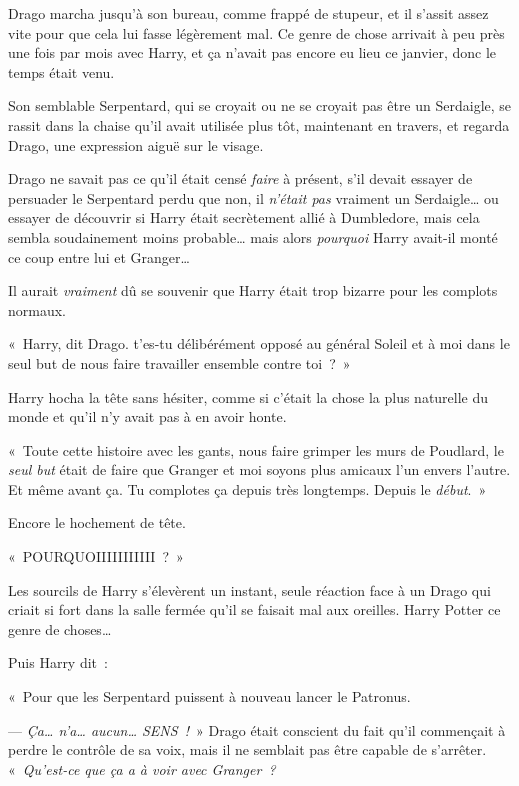 Drago marcha jusqu'à son bureau, comme frappé de stupeur, et il s'assit assez vite pour que cela lui fasse légèrement mal.
Ce genre de chose arrivait à peu près une fois par mois avec Harry, et ça n'avait pas encore eu lieu ce janvier, donc le temps était venu.

Son semblable Serpentard, qui se croyait ou ne se croyait pas être un Serdaigle, se rassit dans la chaise qu'il avait utilisée plus tôt, maintenant en travers, et regarda Drago, une expression aiguë sur le visage.

Drago ne savait pas ce qu'il était censé \emph{faire} à présent, s'il devait essayer de persuader le Serpentard perdu que non, il \emph{n'était pas} vraiment un Serdaigle… ou essayer de découvrir si Harry était secrètement allié à Dumbledore, mais cela sembla soudainement moins probable… mais alors \emph{pourquoi} Harry avait-il monté ce coup entre lui et Granger…

Il aurait \emph{vraiment} dû se souvenir que Harry était trop bizarre pour les complots normaux.

«~Harry, dit Drago. t'es-tu délibérément opposé au général Soleil et à moi dans le seul but de nous faire travailler ensemble contre toi~?~»

Harry hocha la tête sans hésiter, comme si c'était la chose la plus naturelle du monde et qu'il n'y avait pas à en avoir honte.

«~Toute cette histoire avec les gants, nous faire grimper les murs de Poudlard, le \emph{seul but} était de faire que Granger et moi soyons plus amicaux l'un envers l'autre.
Et même avant ça.
Tu complotes ça depuis très longtemps.
Depuis le \emph{début}.~»

Encore le hochement de tête.

«~POURQUOIIIIIIIIIII~?~»

Les sourcils de Harry s'élevèrent un instant, seule réaction face à un Drago qui criait si fort dans la salle fermée qu'il se faisait mal aux oreilles.
 Harry Potter  ce genre de choses…

Puis Harry dit~:

«~Pour que les Serpentard puissent à nouveau lancer le Patronus.

--- \emph{Ça… n'a… aucun…
SENS~!}~» Drago était conscient du fait qu'il commençait à perdre le contrôle de sa voix, mais il ne semblait pas être capable de s'arrêter.
«~\emph{Qu'est-ce que ça a à voir avec Granger~?}

